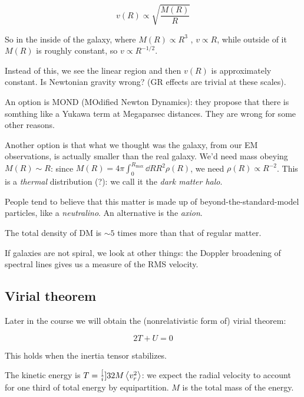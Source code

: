 \documentclass[main.tex]{subfiles}
\begin{document}
\begin{equation}
  v(R) \propto \sqrt{\frac{M(R)}{R}}
\end{equation}

So in the inside of the galaxy, where \(M(R) \propto R^3\) , \(v \propto R\), while outside of it \(M(R)\) is roughly constant, so \(v \propto R^{-1/2}\).

Instead of this, we see the linear region and then \(v(R)\) is approximately constant. Is Newtonian gravity wrong? (GR effects are trivial at these scales).

An option is MOND (MOdified Newton Dynamics): they propose that there is somthing like a Yukawa term at Megaparsec distances. They are wrong for some other reasons.

Another option is that what we thought was the galaxy, from our EM observations, is actually smaller than the real galaxy. We'd need mass obeying \(M (R) \sim R\): since \(M(R) = 4 \pi \int_0^{R_{\text{max}}} \dd{R} R^2 \rho(R)\), we need \(\rho(R) \propto R^{-2}\). This is a \emph{thermal} distribution (?): we call it the \emph{dark matter halo}.

People tend to believe that this matter is made up of beyond-the-standard-model particles, like a \emph{neutralino}.
An alternative is the \emph{axion}.

The total density of DM is \(\sim 5\) times more than that of regular matter.

If galaxies are not spiral, we look at other things: the Doppler broadening of spectral lines gives us a measure of the RMS velocity.

\subsection{Virial theorem}

Later in the course we will obtain the (nonrelativistic form of) virial theorem:

\begin{equation}
  2T + U = 0
\end{equation}

This holds when the inertia tensor stabilizes.

The kinetic energy is \(T = \frac[i]{3}{2} M \expval{v_r^2} \): we expect the radial velocity to account for one third of total energy by equipartition.
\(M\) is the total mass of the energy.
\end{document}

